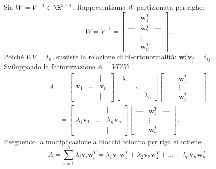 Sia $W = V^{-1} \in \R^{n \times n}$. Rappresentiamo $W$ partizionata per righe:
\begin{equation}
    W = V^{-1} = \begin{bmatrix} \text{---} & \mathbf{w}_1^T & \text{---} \\ \text{---} & \mathbf{w}_2^T & \text{---} \\ & \vdots & \\ \text{---} & \mathbf{w}_n^T & \text{---} \end{bmatrix}.
\end{equation}
Poich\'e $W V = I_n$, sussiste la relazione di bi-ortonormalit\`a: $\mathbf{w}_i^T \mathbf{v}_j = \delta_{ij}$. Sviluppando la fattorizzazione $A = V D W$:
\begin{align}
    A &= \begin{bmatrix} \mid & & \mid \\ \mathbf{v}_1 & \dots & \mathbf{v}_n \\ \mid & & \mid \end{bmatrix} \begin{bmatrix} \lambda_1 & & \\ & \ddots & \\ & & \lambda_n \end{bmatrix} \begin{bmatrix} \text{---} & \mathbf{w}_1^T & \text{---} \\ & \vdots & \\ \text{---} & \mathbf{w}_n^T & \text{---} \end{bmatrix} \nonumber \\
    &= \begin{bmatrix} \mid & & \mid \\ \lambda_1 \mathbf{v}_1 & \dots & \lambda_n \mathbf{v}_n \\ \mid & & \mid \end{bmatrix} \begin{bmatrix} \text{---} & \mathbf{w}_1^T & \text{---} \\ & \vdots & \\ \text{---} & \mathbf{w}_n^T & \text{---} \end{bmatrix}.
\end{align}
Eseguendo la moltiplicazione a blocchi colonna per riga si ottiene:
\begin{equation}
    A = \sum_{i=1}^n \lambda_i \mathbf{v}_i \mathbf{w}_i^T = \lambda_1 \mathbf{v}_1 \mathbf{w}_1^T + \lambda_2 \mathbf{v}_2 \mathbf{w}_2^T + \dots + \lambda_n \mathbf{v}_n \mathbf{w}_n^T.
\end{equation}

